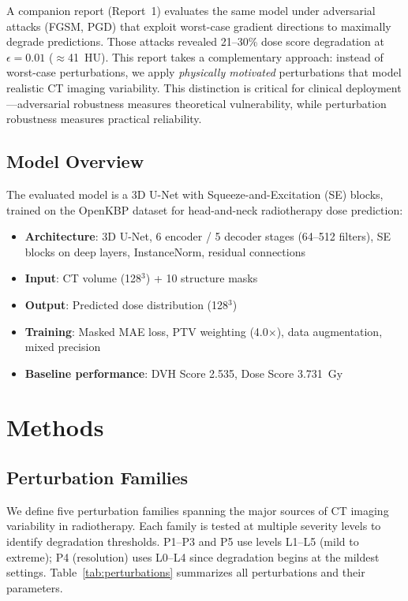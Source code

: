 \documentclass[11pt,a4paper]{article}
\begin{document}
A companion report (Report~1) evaluates the same model under adversarial attacks (FGSM, PGD) that exploit worst-case gradient directions to maximally degrade predictions. Those attacks revealed 21--30\% dose score degradation at $\epsilon = 0.01$ ($\approx$41~HU). This report takes a complementary approach: instead of worst-case perturbations, we apply \emph{physically motivated} perturbations that model realistic CT imaging variability. This distinction is critical for clinical deployment---adversarial robustness measures theoretical vulnerability, while perturbation robustness measures practical reliability.

\subsection{Model Overview}

The evaluated model is a 3D U-Net with Squeeze-and-Excitation (SE) blocks, trained on the OpenKBP dataset for head-and-neck radiotherapy dose prediction:
\begin{itemize}
    \item \textbf{Architecture}: 3D U-Net, 6 encoder / 5 decoder stages (64--512 filters), SE blocks on deep layers, InstanceNorm, residual connections
    \item \textbf{Input}: CT volume (128$^3$) + 10 structure masks
    \item \textbf{Output}: Predicted dose distribution (128$^3$)
    \item \textbf{Training}: Masked MAE loss, PTV weighting (4.0$\times$), data augmentation, mixed precision
    \item \textbf{Baseline performance}: DVH Score 2.535, Dose Score 3.731~Gy
\end{itemize}

\section{Methods}

\subsection{Perturbation Families}

We define five perturbation families spanning the major sources of CT imaging variability in radiotherapy. Each family is tested at multiple severity levels to identify degradation thresholds. P1--P3 and P5 use levels L1--L5 (mild to extreme); P4 (resolution) uses L0--L4 since degradation begins at the mildest settings. Table~\ref{tab:perturbations} summarizes all perturbations and their parameters.
\end{document}
